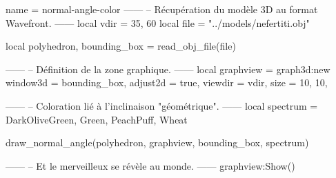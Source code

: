 \documentclass{standalone}
\begin{document}
\begin{luadraw}{name = normal-angle-color}
------
-- Récupération du modèle 3D au format Wavefront.
------
local vdir = {35, 60}
local file = "../models/nefertiti.obj"

local polyhedron, bounding_box = read_obj_file(file)

------
-- Définition de la zone graphique.
------
local graphview = graph3d:new{
  window3d = bounding_box,
  adjust2d = true,
  viewdir  = vdir,
  size     = {10, 10},
}

------
-- Coloration lié à l'inclinaison "géométrique".
------
local spectrum = {DarkOliveGreen, Green, PeachPuff, Wheat}

draw_normal_angle(polyhedron, graphview, bounding_box, spectrum)

------
-- Et le merveilleux se révèle au monde.
------
graphview:Show()

\end{luadraw}
\end{document}
